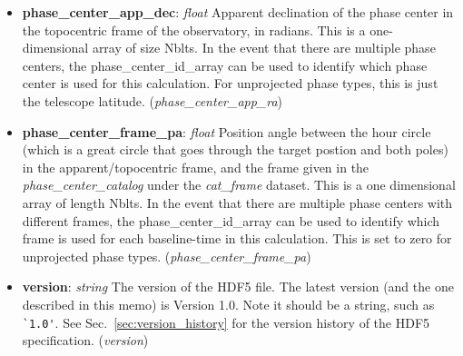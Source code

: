 \documentclass[11pt, oneside]{article}
\begin{document}
\begin{itemize}
\item \textbf{phase\_center\_app\_dec}: \textit{float}
Apparent declination of the phase center in the topocentric frame of the observatory, in radians.
This is a one-dimensional array of size Nblts. In the event that there are multiple phase centers,
the phase\_center\_id\_array can be used to identify which phase center is used for this
calculation. For unprojected phase types, this is just the telescope latitude.
(\textit{phase\_center\_app\_ra})
\item \textbf{phase\_center\_frame\_pa}: \textit{float}
Position angle between the hour circle (which is a great circle that goes through the target
postion and both poles) in the apparent/topocentric frame, and the frame given in the
\textit{phase\_center\_catalog} under the \textit{cat\_frame} dataset. This is a one dimensional array
of length Nblts. In the event that there are multiple phase centers with different frames,
the phase\_center\_id\_array can be used to identify which frame is used for each
baseline-time in this calculation. This is set to zero for unprojected phase types.
(\textit{phase\_center\_frame\_pa})

\item \textbf{version}: \textit{string} The version of the HDF5 file. The latest
  version (and the one described in this memo) is Version 1.0. Note it should be
  a string, such as \verb+`1.0'+. See Sec.~\ref{sec:version_history} for the
  version history of the HDF5 specification. (\textit{version})
\end{itemize}
\end{document}
